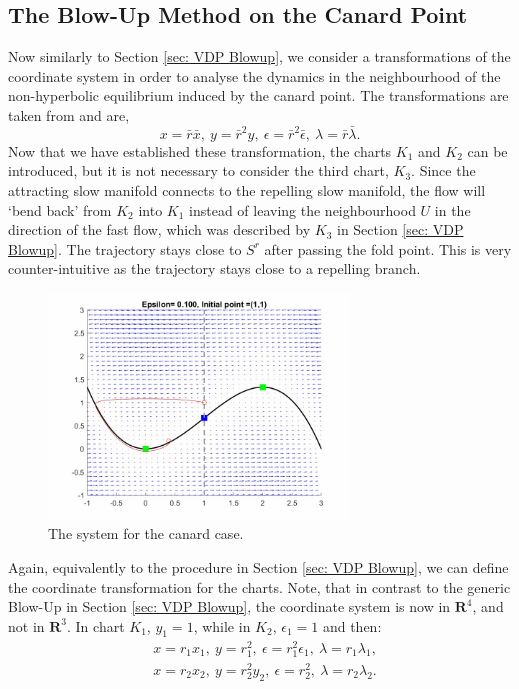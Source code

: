 \subsection{The Blow-Up Method on the Canard Point}
Now similarly to Section \ref{sec: VDP Blowup}, we consider a transformations of the coordinate system in order to analyse the dynamics in the neighbourhood of the non-hyperbolic equilibrium induced by the canard point. %
 The transformations are taken from \citep{krupa2001} and are,
\begin{equation}
x=\bar{r}\bar{x}, \ y=\bar{r}^2y, \ \epsilon=\bar{r}^2\bar{\epsilon}, \ \lambda=\bar{r}\bar{\lambda}.
\end{equation}
Now that we have established these transformation, the charts $K_1$ and $K_2$ can be introduced,  but it is not necessary to consider the third chart, $K_3$. Since the attracting slow manifold connects to the repelling slow manifold, the flow will `bend back' from $K_2$ into $K_1$ instead of leaving the neighbourhood $U$ in the direction of the fast flow, which was described by $K_3$ in Section \ref{sec: VDP Blowup}. 
The trajectory stays close to $S^r$ after passing the fold point. This is very counter-intuitive as the trajectory stays close to a repelling branch.
\begin{figure}[h!]
	\centering
\includegraphics[width=8cm, height=6cm]{Images/vdPhopf-Moment-bendback}
	\caption{The \vdp system for the canard case.}
	\label{fig: flow in canard}
\end{figure}\newpage
Again, equivalently to the procedure in Section \ref{sec: VDP Blowup}, we can define the coordinate transformation for the charts. Note, that in contrast to the generic Blow-Up in Section \ref{sec: VDP Blowup}, the coordinate system is now in $\mathbf{R}^4$, and not in $\mathbf{R}^3$. In chart $K_1$, $y_1=1$, while in $K_2$, $\epsilon_1=1$ and then:
\begin{subequations}
	\begin{align}
	&x=r_1x_1, \ y=r_1^2, \ \epsilon=r_1^2\epsilon_1, \ \lambda=r_1\lambda_1 \label{eq: coordiante K1},\\ 
	&x=r_2x_2, \ y=r_2^2y_2, \ \epsilon=r^2_2, \ \lambda=r_2\lambda_2 \label{eq: coordinate K2}.
	\end{align}
\end{subequations}
